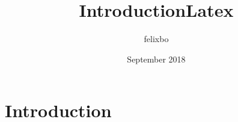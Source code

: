 \documentclass{article}
\title{IntroductionLatex}
\author{felixbo }
\date{September 2018}
\begin{document}
\maketitle

\section{Introduction}
\end{document}

